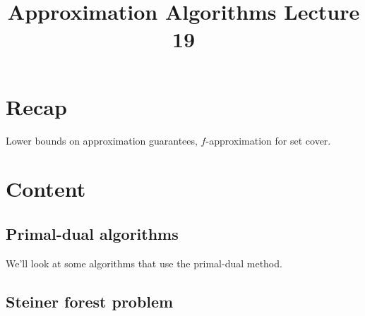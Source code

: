 \documentclass[a4paper]{article}
\title{\textbf{Approximation Algorithms Lecture 19}}
\date{}
\begin{document}
\maketitle
\tableofcontents

\section{Recap}

Lower bounds on approximation guarantees, $f$-approximation for set cover.

\section{Content}

\subsection{Primal-dual algorithms}

We'll look at some algorithms that use the primal-dual method.

\subsection{Steiner forest problem}
\end{document}

